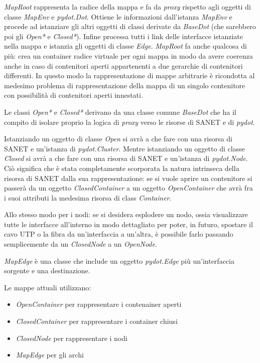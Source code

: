 \documentclass[a4wide,10pt,italian]{manual}
\begin{document}
\emph{MapRoot} rappresenta la radice della mappa e fa da \emph{proxy} rispetto agli oggetti di classe \emph{MapEnv} e \emph{pydot.Dot}.
Ottiene le informazioni dall'istanza \emph{MapEnv} e procede ad istanziare gli altri oggetti di classi derivate da \emph{BaseDot} (che sarebbero poi gli \emph{Open*} e \emph{Closed*}). Infine processa tutti i link delle interfacce istanziate nella mappa e istanzia gli oggetti di classe \emph{Edge}. \emph{MapRoot} fa anche qualcosa di più: crea un container radice virtuale per ogni mappa in modo da avere coerenza anche in caso di contenitori aperti appartenenti a due gerarchie di contenitori differenti. In questo modo la rappresentazione di mappe arbitrarie è ricondotta al medesimo problema di rappresentazione della mappa di un singolo contenitore con possibilità di contenitori aperti innestati.

Le classi \emph{Open*} e \emph{Closed*} derivano da una classe comune \emph{BaseDot} che ha il compito di isolare proprio la logica
di \emph{proxy} verso le risorse di SANET e di \emph{pydot}.

Istanziando un oggetto di classe \emph{Open} si avrà a che fare con una risorsa di SANET e un'istanza di \emph{pydot.Cluster}. Mentre istanziando un oggetto di classe \emph{Closed} si avrà a che fare con una risorsa di SANET e un'istanza di \emph{pydot.Node}. Ciò significa che è stata completamente scorporata la natura intrinseca della risorsa di SANET dalla sua rappresentazione: se si vuole aprire un contenitore si passerà da un oggetto \emph{ClosedContainer} a un oggetto \emph{OpenContainer} che avrà fra i suoi attributi la medesima risorsa di class \emph{Container}.

Allo stesso modo per i nodi: se si desidera esplodere un nodo, ossia visualizzare tutte le interfacce all'interno in modo dettagliato per poter, in futuro, spostare il cavo UTP o la fibra da un'interfaccia a un'altra, è possibile farlo passando semplicemente da un \emph{ClosedNode} a un \emph{OpenNode}.

\emph{MapEdge} è una classe che include un oggetto \emph{pydot.Edge} più un'interfaccia sorgente e una destinazione.

Le mappe attuali utilizzano:
\begin{itemize}
\item {} 
\emph{OpenContainer} per rappresentare i contenainer aperti

\item {} 
\emph{ClosedContainer} per rappresentare i container chiusi

\item {} 
\emph{ClosedNode} per rappresentare i nodi

\item {} 
\emph{MapEdge} per gli archi

\end{itemize}
\end{document}
